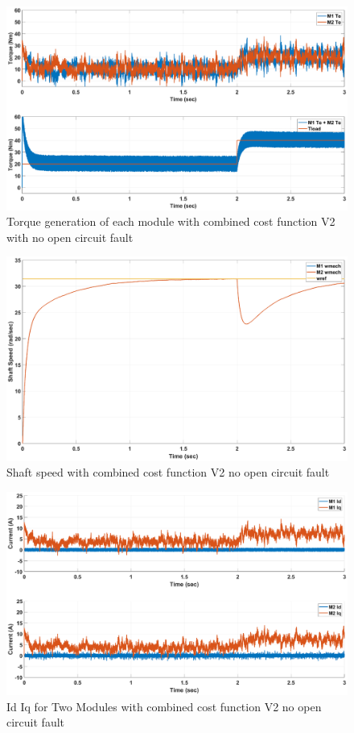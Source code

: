 \documentclass{article}
\begin{document}
\begin{figure}[H]
\centering
\includegraphics[scale=0.3]{Figures/TwoModule/CombinedCostV2/Torques.eps}
\caption{Torque generation of each module with combined cost function V2 with no open circuit fault}
\label{fig:Tload_TwoModuleCombinedCostV2}
\end{figure}
\begin{figure}[H]
\centering
\includegraphics[scale=0.3]{Figures/TwoModule/CombinedCostV2/ShaftSpeed.eps}
\caption{Shaft speed with combined cost function V2 no open circuit fault}
\label{fig:Wshaft_TwoModuleCombinedCostV2}
\end{figure}
\begin{figure}[H]
\centering
\includegraphics[scale=0.3]{Figures/TwoModule/CombinedCostV2/Id_Iq.eps}
\caption{Id Iq for Two Modules with combined cost function V2 no open circuit fault}
\label{fig:Current_dq_TwoModuleCombinedCostV2}
\end{figure}
\end{document}
